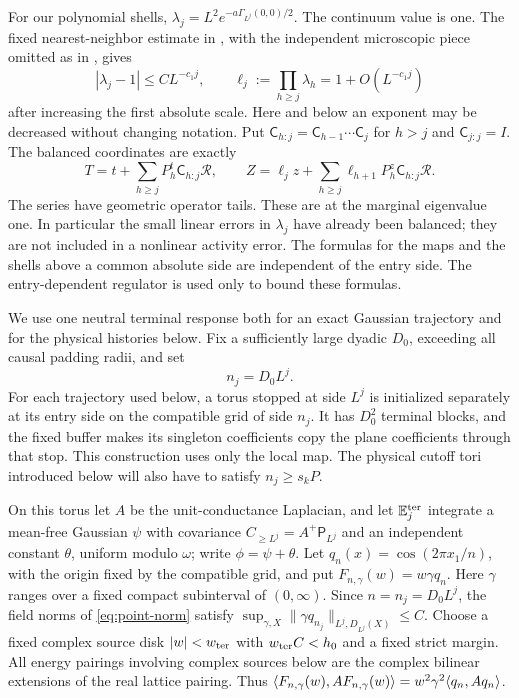 For our polynomial shells, \(\lambda_j=L^2
e^{-a\Gamma_{L^j}(0,0)/2}\).  The continuum value is one.  The
fixed nearest-neighbor estimate in \cite[Lemma~8.1 and its proof]{B},
with the independent microscopic piece omitted as in
\cite[Equation~(9.11)]{B}, gives
\begin{equation}\label{trj:linear-error}
 |\lambda_j-1|\le CL^{-c_1j},\qquad
 \ell_j:=\prod_{h\ge j}\lambda_h=1+O(L^{-c_1j})
\end{equation}
after increasing the first absolute scale.  Here and below an exponent
may be decreased without changing notation.  Put
\(\mathsf C_{h:j}=\mathsf C_{h-1}\cdots\mathsf C_j\) for \(h>j\) and
\(\mathsf C_{j:j}=I\).  The balanced coordinates are exactly
\begin{equation}\label{trj:balance}
 T=t+\sum_{h\ge j}P_h^t\mathsf C_{h:j}\mathcal R,
 \qquad
 Z=\ell_jz+\sum_{h\ge j}\ell_{h+1}P_h^z\mathsf C_{h:j}\mathcal R.
\end{equation}
The series have geometric operator tails.  These are
\cite[Equations~(8.17)--(8.18)]{B} at the marginal eigenvalue one.
In particular the small linear errors in \(\lambda_j\) have already
been balanced; they are not included in a nonlinear activity error.
The formulas for the maps and the shells above a common absolute
side are independent of the entry side.  The entry-dependent regulator
is used only to bound these formulas.

We use one neutral terminal response both for an exact Gaussian
trajectory and for the physical histories below.  Fix a sufficiently
large dyadic \(D_0\), exceeding all causal padding radii, and set
\begin{equation}\label{trj:stopping-tori}
                       n_j=D_0L^j.
\end{equation}
For each trajectory used below, a torus stopped at side \(L^j\) is
initialized separately at its entry side on the compatible grid of
side \(n_j\).  It has \(D_0^2\) terminal blocks, and the fixed buffer
makes its singleton coefficients copy the plane coefficients through
that stop.
This construction uses only the local map.  The physical cutoff tori
introduced below will also have to satisfy \(n_j\ge s_kP\).

On this torus let \(A\) be the unit-conductance Laplacian, and let
\(\mathbb E_j^{\rm ter}\) integrate a mean-free Gaussian \(\psi\) with covariance
\(C_{\ge L^j}=A^+\mathsf P_{L^j}\) and an independent constant
\(\theta\), uniform modulo \(\omega\); write \(\phi=\psi+\theta\).
Let \(q_n(x)=\cos(2\pi x_1/n)\), with the origin fixed by the compatible
grid, and put \(F_{n,\gamma}(w)=w\gamma q_n\).  Here \(\gamma\) ranges
over a fixed compact subinterval of \((0,\infty)\).  Since
\(n=n_j=D_0L^j\), the field norms of \eqref{eq:point-norm} satisfy
\(\sup_{\gamma,X}\|\gamma q_{n_j}\|_{L^j,D_{L^j}(X)}\le C\).
Choose a fixed complex source disk \(|w|<w_{\rm ter}\) with
\(w_{\rm ter}C<h_0\) and a fixed strict margin.  All energy pairings
involving complex sources below are the complex bilinear extensions
of the real lattice pairing.  Thus
\(\langle F_{n,\gamma}(w),AF_{n,\gamma}(w)\rangle
 =w^2\gamma^2\langle q_n,Aq_n\rangle\).

